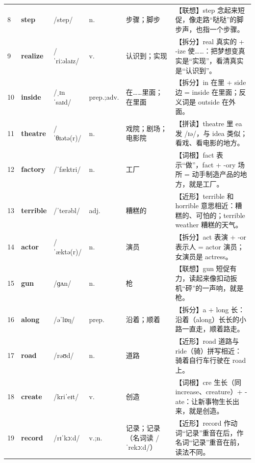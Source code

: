\documentclass[UTF8,a4paper,11pt,oneside]{ctexbook}
\newcommand{\cellword}[1]{{\bfseries\textcolor{wordcol}{#1}}}
\newcommand{\cellipa}[1]{{\footnotesize\textcolor{ipacol}{#1}}}
\newcommand{\cellpos}[1]{\textcolor{poscol}{#1}}
\newcommand{\cellno}[1]{\textcolor{volcolor!75!black}{#1}}
\begin{document}
{\begin{longtable}{@{}C{0.045\textwidth}L{0.155\textwidth}L{0.175\textwidth}C{0.070\textwidth}L{0.180\textwidth}L{0.282\textwidth}@{}}
\cellno{8} & \cellword{step} & \cellipa{/step/} & \cellpos{n.} & 步骤；脚步 & \textcolor{tagAssoc}{【联想】}step 念起来短促，像走路“哒哒”的脚步声，也指一个步骤。 \\
 \cellno{9} & \cellword{realize} & \cellipa{/ˈriːəlaɪz/} & \cellpos{v.} & 认识到；实现 & \textcolor{tagSplit}{【拆分】}real 真实的 + -ize 使……：把梦想变真实是“实现”，看清真实是“认识到”。 \\
\cellno{10} & \cellword{inside} & \cellipa{/ˌɪnˈsaɪd/} & \cellpos{prep.;\allowbreak{}adv.} & 在……里面；在里面 & \textcolor{tagSplit}{【拆分】}in 在里 + side 边 = inside 在里面；反义词是 outside 在外面。 \\
 \cellno{11} & \cellword{theatre} & \cellipa{/ˈθɪətə(r)/} & \cellpos{n.} & 戏院；剧场；电影院 & \textcolor{tagSpell}{【拼读】}theatre 里 ea 发 /ɪə/，与 idea 类似；看戏、看电影的地方。 \\
\cellno{12} & \cellword{factory} & \cellipa{/ˈfæktri/} & \cellpos{n.} & 工厂 & \textcolor{tagRoot}{【词根】}fact 表示“做”，fact + -ory 场所 = 动手制造产品的地方，就是工厂。 \\
 \cellno{13} & \cellword{terrible} & \cellipa{/ˈterəbl/} & \cellpos{adj.} & 糟糕的 & \textcolor{tagNear}{【近形】}terrible 和 horrible 意思相近：糟糕的、可怕的；terrible weather 糟糕的天气。 \\
\cellno{14} & \cellword{actor} & \cellipa{/ˈæktə(r)/} & \cellpos{n.} & 演员 & \textcolor{tagSplit}{【拆分】}act 表演 + -or 表示人 = actor 演员；女演员是 actress。 \\
 \cellno{15} & \cellword{gun} & \cellipa{/ɡʌn/} & \cellpos{n.} & 枪 & \textcolor{tagAssoc}{【联想】}gun 短促有力，读起来像扣动扳机“砰”的一声响，就是枪。 \\
\cellno{16} & \cellword{along} & \cellipa{/əˈlɒŋ/} & \cellpos{prep.} & 沿着；顺着 & \textcolor{tagSplit}{【拆分】}a + long 长：沿着（along）长长的小路一直走，顺着路走。 \\
 \cellno{17} & \cellword{road} & \cellipa{/rəʊd/} & \cellpos{n.} & 道路 & \textcolor{tagNear}{【近形】}road 道路与 ride（骑）拼写相近：骑着自行车行驶在 road 上。 \\
\cellno{18} & \cellword{create} & \cellipa{/kriˈeɪt/} & \cellpos{v.} & 创造 & \textcolor{tagRoot}{【词根】}cre 生长（同 increase、creature）+ -ate：让新事物生长出来，就是创造。 \\
 \cellno{19} & \cellword{record} & \cellipa{/rɪˈkɔːd/} & \cellpos{v.;\allowbreak{}n.} & 记录；记录（名词读 /ˈrekɔːd/） & \textcolor{tagNear}{【近形】}record 作动词“记录”重音在后，作名词“记录”重音在前，读法不同。 \\

\end{longtable}}
\end{document}

